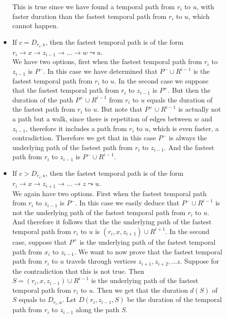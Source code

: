 \documentclass[a4paper,UKenglish,cleveref, autoref, thm-restate]{lipics-v2021}
\begin{document}
\begin{enumerate}[(i)]
\begin{enumerate}[(a)]
\begin{itemize}
            This is true since we have found a temporal path from $r_i$ to $u$, with faster duration than the fastest temporal path from $r_i$ to $u$,
            which cannot happen.
            \item  If $c = D_{r_i,u}$, then 
            the fastest temporal path is of the form $r_i \rightarrow x \rightarrow z_{i-1} \rightarrow \dots \rightarrow w \leadsto u$.\\
            We have two options, first when the fastest temporal path from $r_i$ to $z_{i-1}$ is $P^-$.
            In this case we have determined that $P^- \cup R^{i-1}$ is the fastest temporal path from $r_i$ to $u$.
            In the second case we suppose that the fastest temporal path from $r_i$ to $z_{i-1}$ is $P^+$.
            But then the duration of the path $P^+ \cup R^{i-1}$ from $r_i$ to $u$ equals the duration of the fastest path from $r_i$ to $u$. But note that $P^+ \cup R^{i-1}$ is actually not a path but a walk, since there is repetition of edges between $w$ and $z_{i-1}$,
            therefore it includes a path from $r_i$ to $u$, which is even faster,
            a contradiction.
            Therefore we get that in this case $P^-$ is always the underlying path of the fastest path from $r_i$ to $z_{i-1}$.
            And the fastest path from $r_i$ to $z_{i-1}$ is $P^- \cup R^{i-1}$.
            \item If $c > D_{r_i,u}$, then 
            the fastest temporal path is of the form $r_i \rightarrow x \rightarrow z_{i+1} \rightarrow \dots \rightarrow z \leadsto u$.\\
            We again have two options.
            First when the fastest temporal path from $r_i$ to $z_{i-1}$ is $P^-$.
            In this case we easily deduce that $P^- \cup R^{i-1}$ is not the underlying path of the fastest temporal path from $r_i$ to $u$.
            And therefore it follows that the the underlying path of the fastest temporal path from $r_i$ to $u$ is  $(r_i, x, z_{i+1}) \cup R^{i+1}$.
            In the second case, suppose that $P^+$ is the underlying path of the fastest temporal path from $x_i$ to $z_{i-1}$.
            We want to now prove that the fastest temporal path from $r_i$ to $u$ travels through vertices $z_{i+1}, z_{i+2}, \dots z$.
            Suppose for the contradiction that this is not true. 
            Then $S = (r_i, x, z_{i-1}) \cup R^{i-1}$ is the underlying path of the fastest temporal path from $r_i$ to $u$.
            Then we get that the duration $d(S)$ of $S$ equals to $D_{r_i,u}$.
            Let $D(r_i,z_{i-1},S)$ be the duration of the temporal path from $r_i$ to $z_{i-1}$ along the path $S$.

\end{itemize}
\end{enumerate}
\end{enumerate}
\end{document}
